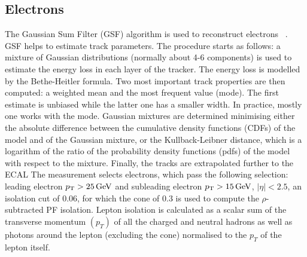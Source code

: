 \subsection{Electrons\label{sec:electrons}}
The Gaussian Sum Filter (GSF) algorithm is used to reconstruct
electrons ~\cite{Khachatryan:2015hwa}. GSF helps to estimate track parameters. The procedure starts as follows: a mixture of Gaussian distributions (normally about 4-6 components) \cite{GSF} is used to estimate the energy loss in each layer of the tracker. The energy loss is modelled by the Bethe-Heitler formula. Two most important track properties are then computed: a weighted mean and the most frequent value (mode). The first estimate is unbiased while the latter one has a smaller width. In practice, mostly one works with the mode. Gaussian mixtures are determined minimising either the absolute difference between the cumulative density functions (CDFs) of the model and of the Gaussian mixture, or the Kullback-Leibner distance, which is a logarithm of the ratio of the probability density functions (pdfs) of the model with respect to the mixture. Finally, the tracks are extrapolated further to the ECAL The measurement selects electrons, which pass the following selection: leading electron $p_{\mathrm{T}}>25\,\text{Ge\hspace{-.08em}V}$ and subleading electron 
$p_{\mathrm{T}}>15\,\text{Ge\hspace{-.08em}V}$, $|\eta|<2.5$, 
an isolation cut of 0.06, for which the cone
of $0.3$ is used to compute the $\rho$-subtracted PF
isolation. Lepton isolation is calculated as a scalar sum of
the transverse momentum $(p_{T})$ of all the charged and
neutral hadrons as well as photons around the lepton
(excluding the cone) normalised to the $p_{T}$ of the lepton
itself. 

        


